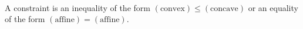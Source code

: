 \\
 A constraint is an inequality of the form 
$(\mbox{convex}) \le (\text{concave})$ or an equality of the form
$(\text{affine}) = (\text{affine})$.
